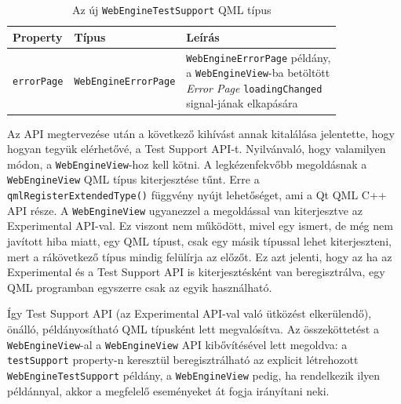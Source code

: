 \documentclass[12pt]{report}
\begin{document}
\begin{table}[ht]
    \centering
    \begin{tabular}{ | l | l | p{195pt} | }
        \hline
        \textbf{Property} & \textbf{Típus} & \textbf{Leírás} \\ \hline

        \texttt{errorPage} & \texttt{WebEngineErrorPage} &
        \makecell[l]{
            \texttt{WebEngineErrorPage} példány, \\
            a \texttt{WebEngineView}-ba betöltött \\
            \textit{Error Page} \texttt{loadingChanged} \\
            signal-jának elkapására}
        \\ \hline
    \end{tabular}
    \caption{
        \label{tab:test-support-webengine-testsupport}
        Az új \texttt{WebEngineTestSupport} QML típus
    }
\end{table}

Az API megtervezése után a következő kihívást annak kitalálása jelentette, hogy
hogyan tegyük elérhetővé, a Test Support API-t. Nyilvánvaló, hogy valamilyen módon,
a \texttt{WebEngineView}-hoz kell kötni. A legkézenfekvőbb megoldásnak a
\texttt{WebEngineView} QML típus kiterjesztése tűnt. Erre a
\texttt{qmlRegisterExtendedType()} függvény nyújt lehetőséget, ami a Qt QML C++ API része.
A \texttt{WebEngineView} ugyanezzel a megoldással van kiterjesztve az Experimental
API-val. Ez viszont nem működött, mivel egy ismert, de még nem javított hiba miatt,
egy QML típust, csak egy másik típussal lehet kiterjeszteni, mert a rákövetkező típus mindig
felülírja az előzőt. Ez azt jelenti, hogy az ha az Experimental és a Test Support API is
kiterjesztésként van beregisztrálva, egy QML programban egyszerre csak az egyik
használható.

Így Test Support API (az Experimental API-val való ütközést elkerülendő), önálló,
példányosítható QML típusként lett megvalósítva. Az összeköttetést a
\texttt{WebEngineView}-al a \texttt{WebEngineView} API kibővítésével lett megoldva:
a \texttt{testSupport} property-n keresztül beregisztrálható az explicit létrehozott
\texttt{WebEngineTestSupport} példány, a \texttt{WebEngineView} pedig, ha rendelkezik
ilyen példánnyal, akkor a megfelelő eseményeket át fogja irányítani neki.
\end{document}
